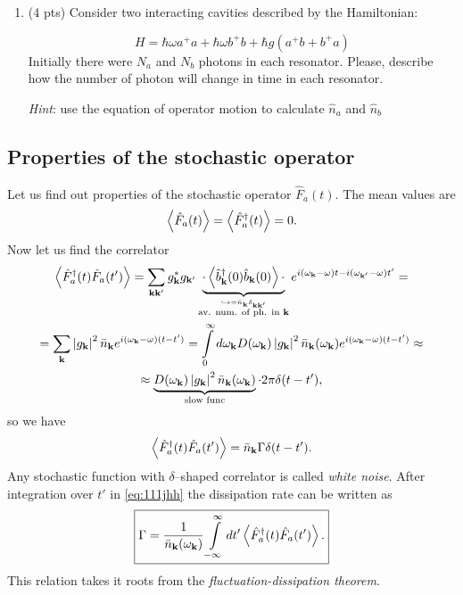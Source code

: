 \begin{hw}

	\begin{enumerate}
		\item (4 pts) Consider two interacting cavities  described by the  Hamiltonian:
		
		$$
		H=\hbar \omega a^{+}a+\hbar\omega b^{+}b+\hbar g(a^{+}b+b^{+}a)
		$$
		 Initially  there were  $N_{a}$ and $N_{b}$ photons in each resonator. Please, describe how the number of photon will change in time in each resonator.
		
		 {\it Hint}:  use the equation of operator motion to calculate $\hat n _a$ and $\hat n _b$
	
	\end{enumerate}
\end{hw}

\subsection{Properties of the stochastic operator}

Let us find out properties of the stochastic operator $\hat{F}_a(t)$. The mean values are
\begin{equation}
	\left\langle {\hat{F}_a(t)} \right\rangle = \left\langle {\hat{F}_a^{\dagger}(t)} \right\rangle = 0.
\end{equation}
Now let us find the correlator
\begin{multline}
	\left\langle {\hat{F}_a^{\dagger}(t) \hat{F}_a(t')} \right\rangle = \sum_{\mathbf{k} \mathbf{k}'} g^*_{\mathbf{k}} g_{\mathbf{k}'} \underbrace{\cdot \left\langle {\hat{b}_{\mathbf{k}}^{\dagger}(0) \hat{b}_{\mathbf{k}}(0)} \right\rangle \cdot }_{\overset{\hookrightarrow=\bar{n}_{\mathbf{k}} \delta_{\mathbf{k}\mathbf{k}'}}{\text{av. num. of ph. in } \mathbf{k}}} e^{i(\omega_{\mathbf{k}} - \omega)t - i(\omega_{\mathbf{k}'} - \omega)t'} = \\
	= \sum_{\mathbf{k}} \left| g_{\mathbf{k}}\right|^2 \bar{n}_{\mathbf{k}} e^{i (\omega_{\mathbf{k}} - \omega)(t - t')} = \int \limits_0^{\infty} d \omega_{\mathbf{k}} D(\omega_{\mathbf{k}}) \left| g_{\mathbf{k}}\right|^2 \bar{n}_{\mathbf{k}} (\omega_{\mathbf{k}}) e^{i (\omega_{\mathbf{k}} - \omega)(t - t')} \approx \\ \approx \underbrace{D(\omega_{\mathbf{k}}) \left| g_{\mathbf{k}}\right|^2 \bar{n}_{\mathbf{k}} (\omega_{\mathbf{k}})}_{\text{slow func}} \cdot 2\pi \delta(t-t'),
\end{multline}
so we have
\begin{equation}
	\left\langle {\hat{F}_a^{\dagger}(t) \hat{F}_a(t')} \right\rangle = \bar{n}_{\mathbf{k}} \Gamma \delta(t - t').
	\label{eq:111jhh}
\end{equation}
Any stochastic function with $\delta$--shaped correlator is called \textit{white noise}. After integration over $t'$ in \eqref{eq:111jhh} the dissipation rate  can be written as
\begin{equation}
	\boxed{\Gamma = \frac{1}{\bar{n}_{\mathbf{k}}(\omega_{\mathbf{k}})} \int \limits_{-\infty}^{\infty} dt' \left\langle {\hat{F}_a^{\dagger}(t) \hat{F}_a(t')} \right\rangle.}
\end{equation}
This relation takes it roots from the \textit{fluctuation-dissipation theorem}.

